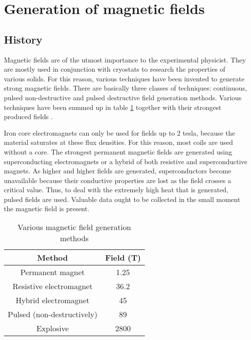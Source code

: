 \section{Generation of magnetic fields}
\subsection{History}

Magnetic fields are of the utmost importance to the experimental physicist.  
They are mostly used in conjunction with cryostats to research the properties 
of various solids. For this reason, various techniques have been invented to 
generate strong magnetic fields. There are basically three classes of 
techniques: continuous, pulsed non-destructive and pulsed destructive field 
generation methods. Various techniques have been summed up in table 
\ref{methodTable} together with their strongest produced fields 
\cite{highPulsedMagnet} \cite{recordField}.

Iron core electromagnets can only be used for fields up to 2 tesla, because the 
material saturates at these flux densities. For this reason, most coils are 
used without a core. The strongest permanent magnetic fields are generated 
using superconducting electromagnets or a hybrid of both resistive and 
superconductive magnets. As higher and higher fields are generated, 
superconductors become unavailable because their conductive properties are lost 
as the field crosses a critical value. Thus, to deal with the extremely high 
heat that is generated, pulsed fields are used. Valuable data ought to be 
collected in the small moment the magnetic field is present. \cite{herlach} 

\begin{table}
\begin{center}
\caption{Various magnetic field generation methods}
\label{methodTable}
\begin{tabular}{c|c}
Method & Field (T) \\
\hline
Permanent magnet & 1.25\\
Resistive electromagnet & 36.2\\
Hybrid electromagnet & 45\\
Pulsed (non-destructively) & 89\\
Explosive & 2800 \\
\end{tabular}
\end{center}
\end{table}

